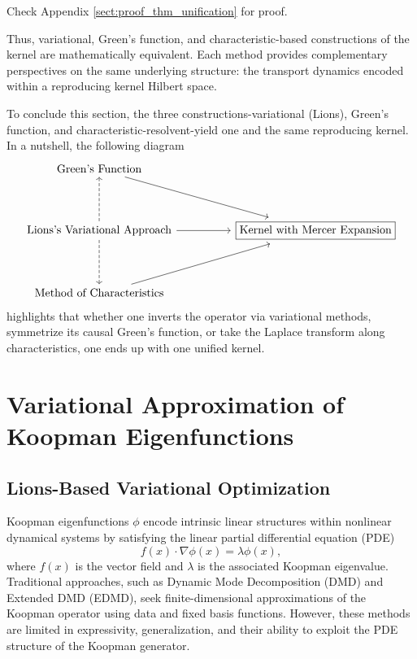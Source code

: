 \documentclass[11pt]{article}
\theoremstyle{plain}
\def\[{\begin{equation}}
\def\]{\end{equation}}
\begin{document}
Check Appendix \ref{sect:proof_thm_unification}
 for proof.
 
 

Thus, variational, Green's function, and characteristic-based constructions of the kernel are mathematically equivalent. Each method provides complementary perspectives on the same underlying structure: the transport dynamics encoded within a reproducing kernel Hilbert space.


To conclude this section, the three constructions-variational (Lions), Green’s function, and characteristic-resolvent-yield one and the same reproducing kernel. In a nutshell, the following diagram
 \[
\begin{tikzcd}[row sep=huge, column sep=huge]
\text{Green's Function} \arrow[dr] & \\
\text{Lions's Variational Approach} \arrow[r] \arrow[u, dashed] \arrow[d, dashed] & \boxed{\text{Kernel with Mercer Expansion}} \\
\text{Method of Characteristics} \arrow[ur] &
\end{tikzcd}
\]
highlights that whether one inverts the operator via variational methods, symmetrize its causal Green’s function, or take the Laplace transform along characteristics, one ends up with one unified kernel.




\section{Variational Approximation of Koopman Eigenfunctions}
\subsection{Lions-Based Variational Optimization}



Koopman eigenfunctions $\phi$ encode intrinsic linear structures within nonlinear dynamical systems by satisfying the linear partial differential equation (PDE)
\[
f(x) \cdot \nabla \phi(x) = \lambda \phi(x),
\]
where $f(x)$ is the vector field and $\lambda$ is the associated Koopman eigenvalue. Traditional approaches, such as Dynamic Mode Decomposition (DMD) and Extended DMD (EDMD), seek finite-dimensional approximations of the Koopman operator using data and fixed basis functions. However, these methods are limited in expressivity, generalization, and their ability to exploit the PDE structure of the Koopman generator.
\end{document}
